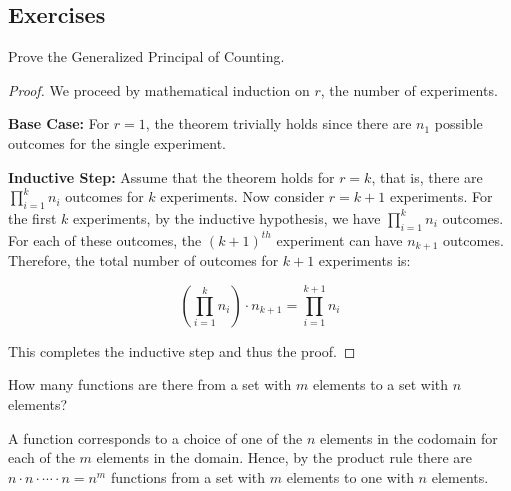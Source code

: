     \subsection{Exercises}
    \begin{exercise}
        Prove the Generalized Principal of Counting.
    \end{exercise}
    \begin{proof}
        We proceed by mathematical induction on \( r \), the number of experiments.
        
        \textbf{Base Case:} For \( r = 1 \), the theorem trivially holds since there are \( n_1 \) possible outcomes for the single experiment.
        
        \textbf{Inductive Step:} Assume that the theorem holds for \( r = k \), that is, there are \( \prod_{i=1}^k n_i \) outcomes for \( k \) experiments. Now consider \( r = k + 1 \) experiments. For the first \( k \) experiments, by the inductive hypothesis, we have \( \prod_{i=1}^k n_i \) outcomes. For each of these outcomes, the \( (k+1)^{th} \) experiment can have \( n_{k+1} \) outcomes. Therefore, the total number of outcomes for \( k + 1 \) experiments is:
        
        \[
        \left( \prod_{i=1}^k n_i \right) \cdot n_{k+1} = \prod_{i=1}^{k+1} n_i
        \]
        
        This completes the inductive step and thus the proof.
    \end{proof}
        
    \begin{exercise}
        How many functions are there from a set with $m$ elements to a set with $n$ elements?
    \end{exercise}
    \begin{solution}
        A function corresponds to a choice of one of the $n$ elements in the codomain for each of
        the $m$ elements in the domain. Hence, by the product rule there are $n\cdot n\cdot\cdots\cdot n=n^m$ functions from a set with $m$ elements to one with $n$ elements. 
    \end{solution}

